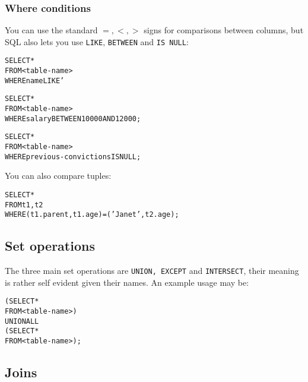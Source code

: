 \begin{mymulticols}
  \subsubsection{Where conditions}

  You can use the standard $=, <, >$ signs for comparisons between columns,
  but SQL also lets you use \texttt{LIKE}, \texttt{BETWEEN} and \texttt{IS NULL}:

  \begin{alltt}
  	SELECT *\\
  	FROM <table-name>\\
  	WHERE name LIKE '%BOB%';
  \end{alltt}

  \begin{alltt}
  	SELECT *\\
  	FROM <table-name>\\
  	WHERE salary BETWEEN 10000 AND 12000;
  \end{alltt}

  \begin{alltt}
  	SELECT *\\
  	FROM <table-name>\\
  	WHERE previous-convictions IS NULL;
  \end{alltt}

  You can also compare tuples:

  \begin{alltt}
  	SELECT *\\
  	FROM t1, t2\\
  	WHERE (t1.parent, t1.age) = ('Janet', t2.age);
  \end{alltt}

  \subsection{Set operations}

  The three main set operations are \texttt{UNION, EXCEPT} and \texttt{INTERSECT},
  their meaning is rather self evident given their names. An example usage may be:

  \begin{alltt}
  	(SELECT *\\
  	 FROM <table-name>)\\
  	UNION ALL\\
  	(SELECT *\\
  	 FROM <table-name>);
  \end{alltt}

  \subsection{Joins}


\end{mymulticols}
